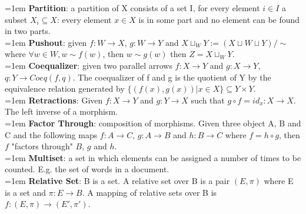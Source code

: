 \documentclass[11pt, oneside]{article}   	%
\begin{document}
\hangindent=1em
\textbf{Partition}: a partition of X consists of a set I, for every element $i \in I$ a subset $X_i \subseteq X$: every element $x \in X$ is in some part and no element can be found in two parts. \\

\hangindent=1em
\textbf{Pushout}: given $f : W \rightarrow X$, $g : W \rightarrow Y$ and $X \sqcup_W Y := (X \sqcup W \sqcup Y)/ \sim$ where $\forall w \in W, w \sim f(w)$, then $w \sim g(w)$ then $Z = X \sqcup_W Y$. \\

\hangindent=1em
\textbf{Coequalizer}: given two parallel arrows $f : X \rightarrow Y$ and $g: X \rightarrow Y$, $q: Y \rightarrow Coeq(f,q)$. The coequalizer of f and g is the quotient of Y by the equivalence relation generated by $\{(f(x),g(x)) | x \in X\} \subseteq Y \times Y$. \\

\hangindent=1em
\textbf{Retractions}: Given $f: X \rightarrow Y$ and $g: Y \rightarrow X$  such that $g \circ f = id_x : X \rightarrow X$. The left inverse of a morphism. \\

\hangindent=1em
\textbf{Factor Through}: composition of morphisms. Given three object A, B and C and the following maps $f: A \rightarrow C$, $g : A \rightarrow B$ and $h : B \rightarrow C$ where $f = h \circ g$, then $f$ "factors through" $B$, $g$ and $h$. \\

\hangindent=1em
\textbf{Multiset}: a set in which elements can be assigned a number of times to be counted. E.g. the set of words in a document. \\

\hangindent=1em
\textbf{Relative Set}: B is a set. A relative set over B is a pair $(E,\pi)$ where E is a set and $\pi : E \rightarrow B$. A mapping of relative sets over B is $f : (E,\pi) \rightarrow (E', \pi ')$. \\


\end{document}
